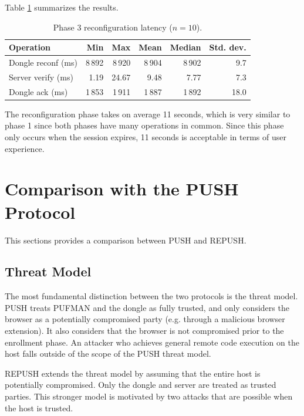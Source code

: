 Table \ref{tab:perf-phase3} summarizes the results.

\begin{table}[ht!]
\centering
\caption{Phase 3 reconfiguration latency ($n=10$).}
\begin{tabular}{lrrrrr}
\hline
\textbf{Operation} & \textbf{Min} & \textbf{Max} & \textbf{Mean} & \textbf{Median} & \textbf{Std. dev.} \\
\hline
Dongle reconf (ms) & 8\,892 & 8\,920 & 8\,904 & 8\,902 &  9.7 \\
Server verify (ms) &   1.19 &  24.67 &   9.48 &   7.77 &  7.3 \\
Dongle ack (ms)    & 1\,853 & 1\,911 & 1\,887 & 1\,892 & 18.0 \\
\hline
\end{tabular}
\label{tab:perf-phase3}
\end{table}

The reconfiguration phase takes on average 11 seconds, which is very similar to phase 1 since both phases have many operations in common. Since this phase only occurs when the session expires, 11 seconds is acceptable in terms of user experience.


\section{Comparison with the PUSH Protocol}
This sections provides a comparison between PUSH \cite{10.1007/978-3-032-07894-0_7} and REPUSH.

\subsection{Threat Model}
The most fundamental distinction between the two protocols is the threat model. PUSH treats PUFMAN and the dongle as fully trusted, and only considers the browser as a potentially compromised party (e.g. through a malicious browser extension). It also considers that the browser is not compromised prior to the enrollment phase. An attacker who achieves general remote code execution on the host falls outside of the scope of the PUSH threat model.

REPUSH extends the threat model by assuming that the entire host is potentially compromised. Only the dongle and server are treated as trusted parties. This stronger model is motivated by two attacks that are possible when the host is trusted.

